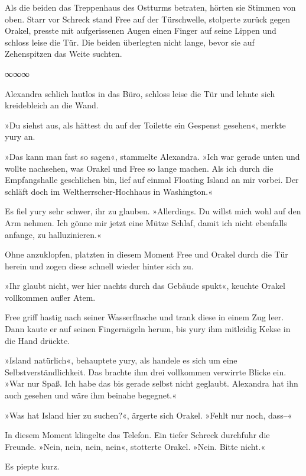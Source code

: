 Als die beiden das Treppenhaus des Ostturms betraten, hörten sie Stimmen von oben. Starr vor Schreck stand Free auf der Türschwelle, stolperte zurück gegen Orakel, presste mit aufgerissenen Augen einen Finger auf seine Lippen und schloss leise die Tür. Die beiden überlegten nicht lange, bevor sie auf Zehenspitzen das Weite suchten.

\begin{center}
	∞∞∞
\end{center}

Alexandra schlich lautlos in das Büro, schloss leise die Tür und lehnte sich kreidebleich an die Wand.

»Du siehst aus, als hättest du auf der Toilette ein Gespenst gesehen«, merkte yury an.

»Das kann man fast so sagen«, stammelte Alexandra. »Ich war gerade unten und wollte nachsehen, was Orakel und Free so lange machen. Als ich durch die Empfangshalle geschlichen bin, lief auf einmal Floating Island an mir vorbei. Der schläft doch im Weltherrscher-Hochhaus in Washington.«

Es fiel yury sehr schwer, ihr zu glauben. »Allerdings. Du willst mich wohl auf den Arm nehmen. Ich gönne mir jetzt eine Mütze Schlaf, damit ich nicht ebenfalls anfange, zu halluzinieren.«

Ohne anzuklopfen, platzten in diesem Moment Free und Orakel durch die Tür herein und zogen diese schnell wieder hinter sich zu.

»Ihr glaubt nicht, wer hier nachts durch das Gebäude spukt«, keuchte Orakel vollkommen außer Atem.

Free griff hastig nach seiner Wasserflasche und trank diese in einem Zug leer. Dann kaute er auf seinen Fingernägeln herum, bis yury ihm mitleidig Kekse in die Hand drückte.

»Island natürlich«, behauptete yury, als handele es sich um eine Selbstverständlichkeit. Das brachte ihm drei vollkommen verwirrte Blicke ein. »War nur Spaß. Ich habe das bis gerade selbst nicht geglaubt. Alexandra hat ihn auch gesehen und wäre ihm beinahe begegnet.«

»Was hat Island hier zu suchen?«, ärgerte sich Orakel. »Fehlt nur noch, dass–«

In diesem Moment klingelte das Telefon. Ein tiefer Schreck durchfuhr die Freunde. »Nein, nein, nein, nein«, stotterte Orakel. »Nein. Bitte nicht.«

 Es piepte kurz.

